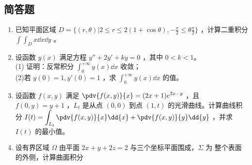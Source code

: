 \subsection{简答题}
\begin{enumerate}
\item 已知平面区域 $\displaystyle D=\{(r,\theta)|2 \le r \le 2(1+\cos \theta),-\frac{\pi}{2} \le \theta \frac{\pi}{2}\}$  ，计算二重积分 $\displaystyle \int\int_D x\dd{x}\dd{y}$ 。
\item 设函数 $y(x)$ 满足方程 $y''+2y'+ky=0$ ，其中 $0<k<1$。\\
(1) 证明：反常积分  $\displaystyle \int_0^{+\infty} y(x)\dd{x}$ 收敛；\\
(2)若 $y(0)=1,y'(0)=1$  ，求 $\displaystyle \int_0^{+\infty} y(x)\dd{x}$ 的值。
\item 设函数 $f(x,y)$ 满足 $\displaystyle \pdv{f(x,y)}{x}=(2x+1)e^{2x-y}$ ，且 $f(0,y)=y+1$  ，$L_t$ 是从点 $(0,0)$ 到点 $(1,t)$ 的光滑曲线。计算曲线积分 $\displaystyle I(t)=\int_{L_t}\pdv{f(x,y)}{x}\dd{x}+\pdv{f(x,y)}{y}\dd{y}$ ，并求 $I(t)$ 的最小值。
\item 设有界区域 $\Omega$ 由平面 $2x+y+2z=2$ 与三个坐标平面围成，$\Sigma$  为  整个表面的外侧，计算曲面积分
\end{enumerate}
